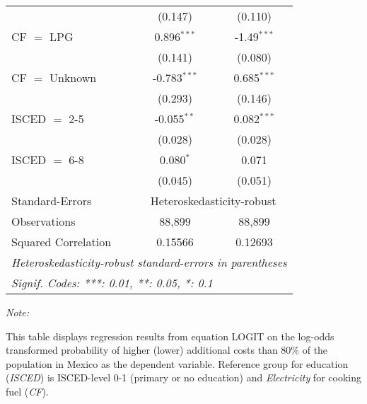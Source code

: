 \begin{table}[htbp!]
\begin{adjustbox}{width = 1\textwidth, max height = 0.95\textheight, center}
\begin{threeparttable}[b]
\begin{tabular}{lcc}
                                 & (0.147)        & (0.110)\\   
            CF $=$ LPG           & 0.896$^{***}$  & -1.49$^{***}$\\   
                                 & (0.141)        & (0.080)\\   
            CF $=$ Unknown       & -0.783$^{***}$ & 0.685$^{***}$\\   
                                 & (0.293)        & (0.146)\\   
            ISCED $=$ 2-5        & -0.055$^{**}$  & 0.082$^{***}$\\   
                                 & (0.028)        & (0.028)\\   
            ISCED $=$ 6-8        & 0.080$^{*}$    & 0.071\\   
                                 & (0.045)        & (0.051)\\   
            \midrule 
            Standard-Errors & \multicolumn{2}{c}{Heteroskedasticity-robust} \\ 
            Observations         & 88,899         & 88,899\\  
            Squared Correlation  & 0.15566        & 0.12693\\  
            \midrule \midrule
            \multicolumn{3}{l}{\emph{Heteroskedasticity-robust standard-errors in parentheses}}\\
            \multicolumn{3}{l}{\emph{Signif. Codes: ***: 0.01, **: 0.05, *: 0.1}}\\
         \end{tabular}
         
         \begin{tablenotes}\item \medskip \textit{Note:}
            \item This table displays regression results from equation LOGIT on the log-odds transformed probability of higher (lower) additional costs than 80\% of the population in Mexico as the dependent variable. Reference group for education (\textit{ISCED}) is ISCED-level 0-1 (primary or no education) and \textit{Electricity} for cooking fuel (\textit{CF}).
         \end{tablenotes}
      \end{threeparttable}
   \end{adjustbox}
\end{table}


